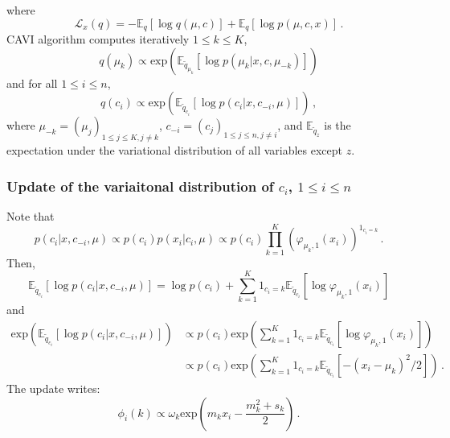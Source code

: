 \documentclass[english,graybox,envcountchap,envcountsame,sectrefs,shortlabels]{svmono}
\theoremstyle{style}
\begin{document}
where
$$
\mathcal{L}_x(q)= -\mathbb{E}_q[\log q(\mu,c)] + \mathbb{E}_q[\log p(\mu,c,x)] \,.
$$
CAVI algorithm computes iteratively $1\leqslant k \leqslant K$,
$$
q(\mu_k) \propto \mathrm{exp}\left(\mathbb{E}_{\tilde q_{\mu_k}}[\log p(\mu_k|x,c,\mu_{-k})]\right)
$$
and for all $1\leqslant i \leqslant n$,
$$
q(c_i) \propto \mathrm{exp}\left(\mathbb{E}_{\tilde q_{c_i}}[\log p(c_i|x,c_{-i},\mu)]\right)\,,
$$
where $\mu_{-k} = (\mu_j)_{1\leq j \leq K, j\neq k}$, $c_{-i} = (c_j)_{1\leq j \leq n, j\neq i}$, and  $\mathbb{E}_{\tilde q_z}$ is the expectation under the variational distribution of all variables except $z$. 
\subsubsection*{Update of the variaitonal distribution of $c_i$, $1\leq i \leq n$}
Note that
$$
p(c_i|x,c_{-i},\mu) \propto p(c_i)p(x_i|c_i,\mu) \propto p(c_i)\prod_{k=1}^K \left(\varphi_{\mu_k,1}(x_i)\right)^{1_{c_i=k}}\,. 
$$
Then,
$$
\mathbb{E}_{\tilde q_{c_i}}[\log p(c_i|x,c_{-i},\mu)] = \log p(c_i) + \sum_{k=1}^K 1_{c_i=k} \mathbb{E}_{\tilde q_{c_i}}[\log \varphi_{\mu_k,1}(x_i)]
$$
and
\begin{align*}
\mathrm{exp}\left(\mathbb{E}_{\tilde q_{c_i}}[\log p(c_i|x,c_{-i},\mu)]\right) &\propto p(c_i) \mathrm{exp}\left(\sum_{k=1}^K 1_{c_i=k} \mathbb{E}_{\tilde q_{c_i}}[\log \varphi_{\mu_k,1}(x_i)]\right)\,\\
&\propto p(c_i) \mathrm{exp}\left(\sum_{k=1}^K 1_{c_i=k} \mathbb{E}_{\tilde q_{c_i}}[-(x_i-\mu_k)^2/2]\right)\,.
\end{align*}
The update writes:
$$
\phi_i(k) \propto \omega_k\mathrm{exp}\left(m_k x_i - \frac{m^2_k + s_k}{2}\right)\,.
$$
\end{document}
